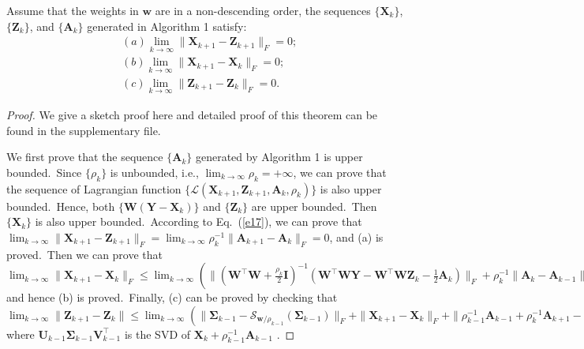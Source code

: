 \begin{theorem}
\label{th1}
Assume that the weights in $\bm{w}$ are in a non-descending order, the sequences $\{\mathbf{X}_{k}\}$, $\{\mathbf{Z}_{k}\}$, and $\{\mathbf{A}_{k}\}$ generated in Algorithm 1 satisfy:
\begin{align}
&(a) \lim_{k \to \infty} \|\mathbf{X}_{k+1}-\mathbf{Z}_{k+1}\|_{F}=0;
\\
&(b) \lim_{k \to \infty} \|\mathbf{X}_{k+1}-\mathbf{X}_{k}\|_{F}=0;
\\
&(c) \lim_{k \to \infty} \|\mathbf{Z}_{k+1}-\mathbf{Z}_{k}\|_{F}=0.
\end{align}
\end{theorem}
\begin{proof}
We give a sketch proof here and detailed proof of this theorem can be found in the supplementary file. 

We first prove that the sequence $\{\mathbf{A}_{k}\}$ generated by Algorithm 1 is upper bounded.\ Since $\{\rho_{k}\}$ is unbounded, i.e., $\lim_{k\to\infty}{\rho_{k}}=+\infty$, we can prove that the sequence of Lagrangian function $\{\mathcal{L}(\mathbf{X}_{k+1},\mathbf{Z}_{k+1},\mathbf{A}_{k},\rho_{k})\}$ is also upper bounded.\ Hence, both $\{\mathbf{W}(\mathbf{Y}-\mathbf{X}_{k})\}$ and $\{\mathbf{Z}_{k}\}$ are upper bounded.\ Then $\{\mathbf{X}_{k}\}$ is also upper bounded.\ According to Eq.\ (\ref{e17}), we can prove that 
$
\lim_{k \to \infty} 
\|
\mathbf{X}_{k+1}
-
\mathbf{Z}_{k+1}
\|_{F}
=
\lim_{k \to \infty} 
\rho_{k}^{-1}
\|
\mathbf{A}_{k+1}
-
\mathbf{A}_{k}
\|_{F}
=
0
$,
and (a) is proved.\ Then we can prove that 
$
\lim_{k \to \infty} 
\|
\mathbf{X}_{k+1}
-
\mathbf{X}_{k}
\|_{F}
\le
\lim_{k \to \infty} 
(\|
(\mathbf{W}^{\top}\mathbf{W}
+
\frac{\rho_{k}}{2}
\mathbf{I})^{-1}
(\mathbf{W}^{\top}\mathbf{W}\mathbf{Y}
-
\mathbf{W}^{\top}\mathbf{W}\mathbf{Z}_{k}
-
\frac{1}{2}
\mathbf{A}_{k})
\|_{F}
+
\rho_{k}^{-1}\|
\mathbf{A}_{k}-\mathbf{A}_{k-1}
\|_{F})
=
0
$
and hence (b) is proved.\ Finally, (c) can be proved by checking that 
$
\lim_{k \to \infty} \|\mathbf{Z}_{k+1}-\mathbf{Z}_{k}\|
\le
\lim_{k \to \infty} 
(\|
\mathbf{\Sigma}_{k-1}-\mathcal{S}_{\bm{w}/\rho_{k-1}}(\mathbf{\Sigma}_{k-1})
\|_{F}
+
\|
\mathbf{X}_{k+1}-\mathbf{X}_{k}
\|_{F}
+
\|
\rho_{k-1}^{-1}\mathbf{A}_{k-1}
+
\rho_{k}^{-1}\mathbf{A}_{k+1}
-
\rho_{k}^{-1}\mathbf{A}_{k}
\|_{F})
=
0,
$
where $\mathbf{U}_{k-1}\mathbf{\Sigma}_{k-1}\mathbf{V}_{k-1}^{\top}$ is the SVD of $\mathbf{X}_{k}+\rho_{k-1}^{-1}\mathbf{A}_{k-1}$
.
\end{proof}



